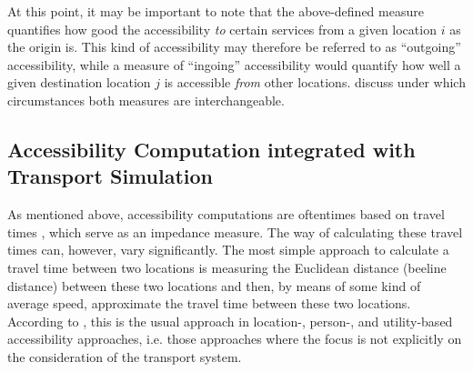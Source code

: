 At this point, it may be important to note that the above-defined measure quantifies how good the accessibility \textit{to} 
certain services from a given location $i$ as the origin is. This kind of accessibility may therefore be referred to 
as ``outgoing'' accessibility, while a measure of ``ingoing'' accessibility would quantify how well a given destination 
location $j$ is accessible \textit{from} other locations. \citet{NicolaiNagel2012HiResAccessibilityMethodInBook} 
discuss under which circumstances both measures are interchangeable.

\subsection{Accessibility Computation integrated with Transport Simulation}
\label{sec:integrated}
As mentioned above, accessibility computations are oftentimes based on travel times 
\citep{BBSR20xxErreichbarkeitsmodell, BuettnerEtAl2010Erreichbarkeitsatlas}
, which serve as an impedance measure. The way of calculating these travel times can, however, vary significantly. 
The most simple approach to calculate a travel time between two locations is measuring the Euclidean distance 
(beeline distance) between these two locations and then, by means of some kind of average speed, approximate the 
travel time between these two locations. According to \citet{Geurs2004AccessibilityReview}, this is the usual 
approach in location-, person-, and utility-based accessibility approaches, i.e. those approaches where the focus 
is not explicitly on the consideration of the transport system.



